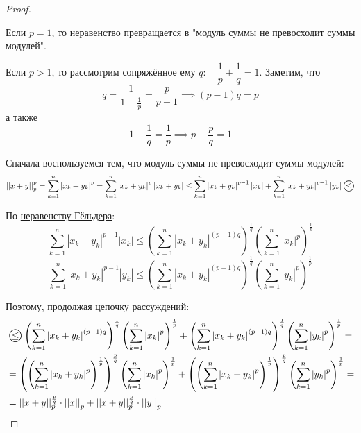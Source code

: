 \documentclass[../main.tex]{subfiles}
\begin{document}
\begin{proof}

    ~

    Если \( p=1\), то неравенство превращается в "модуль суммы не превосходит суммы модулей". 

    Если \( p > 1\), то рассмотрим сопряжённое ему \( q:\quad \dfrac{ 1}{ p} + \dfrac{ 1}{ q} =1\). Заметим, что
    \[ q = \dfrac{ 1}{ 1- \frac{ 1}{ p} }= \dfrac{ p}{ p-1} \implies \left( p-1\right)q=p \]
    а также
    \[ 1- \dfrac{ 1}{ q} = \dfrac{ 1}{ p}  \implies p- \dfrac{ p}{ q} =1 \]

    Сначала воспользуемся тем, что модуль суммы не превосходит суммы модулей:
    \[ \left| \left| x+y\right|\right|_p^p= \sum\limits_{ k=1}^{ n} \left| x_k+y_k\right|^p= \sum\limits_{ k=1}^{ n} \left| x_k+y_k\right|^p\left| x_k+y_k\right| \leq \sum\limits_{ k=1}^{ n} \left| x_k+y_k\right|^{p-1}\left| x_k\right|+ \sum\limits_{ k=1}^{ n} \left| x_k+y_k\right|^{p-1}\left| y_k\right| \oleq\]

    По \hyperlink{thm:Gelder}{неравенству Гёльдера}:
    \[ \sum\limits_{ k=1}^{ n} \left| x_k+y_k\right|^{p-1}\left| x_k\right| \leq \left( \sum\limits_{ k=1}^{ n} \left| x_k+y_k\right|^{(p-1)q}\right)^ \frac{ 1}{ q} \left( \sum\limits_{ k=1}^{ n} \left| x_k\right|^p\right)^ \frac{ 1}{ p} \]
    \[ \sum\limits_{ k=1}^{ n} \left| x_k+y_k\right|^{p-1}\left| y_k\right| \leq \left( \sum\limits_{ k=1}^{ n} \left| x_k+y_k\right|^{(p-1)q}\right)^ \frac{ 1}{ q} \left( \sum\limits_{ k=1}^{ n} \left| y_k\right|^p\right)^ \frac{ 1}{ p} \]

    Поэтому, продолжая цепочку рассуждений:
    \begin{equation*}
        \begin{aligned}
            &\oleq \left( \sum\limits_{ k=1}^{ n} \left| x_k+y_k\right|^{(p-1)q}\right)^ \frac{ 1}{ q} \left( \sum\limits_{ k=1}^{ n} \left| x_k\right|^p\right)^ \frac{ 1}{ p} + \left( \sum\limits_{ k=1}^{ n} \left| x_k+y_k\right|^{(p-1)q}\right)^ \frac{ 1}{ q} \left( \sum\limits_{ k=1}^{ n} \left| y_k\right|^p\right)^ \frac{ 1}{ p} = \\
            &=\left(\left( \sum\limits_{ k=1}^{ n} \left| x_k+y_k\right|^p\right)^ \frac{ 1}{ p}\right)^ \frac{ p}{ q} \left( \sum\limits_{ k=1}^{ n} \left| x_k\right|^p\right)^ \frac{ 1}{ p} + \left(\left( \sum\limits_{ k=1}^{ n} \left| x_k+y_k\right|^p\right)^ \frac{ 1}{ p}\right)^ \frac{ p}{ q} \left( \sum\limits_{ k=1}^{ n} \left| y_k\right|^p\right)^ \frac{ 1}{ p} =\\
            &=\left| \left| x+y\right|\right|_p^ \frac{ p}{ q} \cdot \left| \left| x\right|\right|_p+ \left| \left| x+y\right|\right|_p^ \frac{ p}{ q} \cdot \left| \left| y\right|\right|_p
        \end{aligned}
    \end{equation*}


\end{proof}
\end{document}
